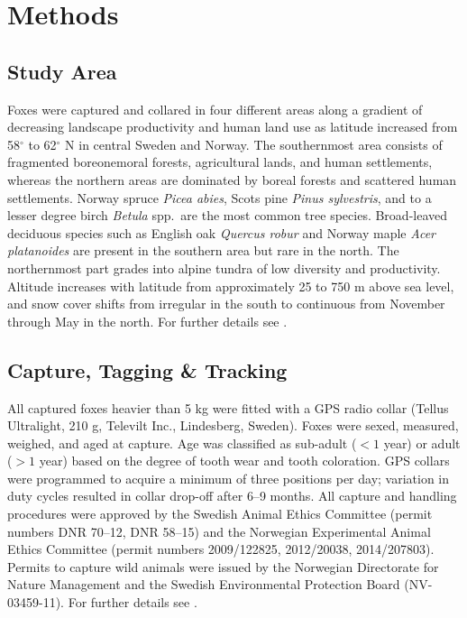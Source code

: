 \documentclass[12pt,a4paper,final,abstract=true,headings=small]{scrartcl}
\begin{document}
\section*{Methods}

\subsection*{Study Area}

Foxes were captured and collared in four different areas along a gradient of decreasing landscape productivity and human land use as latitude increased from 58$^{\circ}$ to 62$^{\circ}$ N in central Sweden and Norway. The southernmost area consists of fragmented boreonemoral forests, agricultural lands, and human settlements, whereas the northern areas are dominated by boreal forests and scattered human settlements. Norway spruce \emph{Picea abies}, Scots pine \emph{Pinus sylvestris}, and to a lesser degree birch \emph{Betula} spp.\ are the most common tree species. Broad-leaved deciduous species such as English oak \emph{Quercus robur} and Norway maple \emph{Acer platanoides} are present in the southern area but rare in the north. The northernmost part grades into alpine tundra of low diversity and productivity. Altitude increases with latitude from approximately 25 to 750 m above sea level, and snow cover shifts from irregular in the south to continuous from November through May in the north. For further details see \citet{waltonVariationHomeRange2017}.

\subsection*{Capture, Tagging \& Tracking}

All captured foxes heavier than 5 kg were fitted with a GPS radio collar (Tellus Ultralight, 210 g, Televilt Inc., Lindesberg, Sweden). Foxes were sexed, measured, weighed, and aged at capture. Age was classified as sub-adult ($< 1$ year) or adult ($> 1$ year) based on the degree of tooth wear and tooth coloration. GPS collars were programmed to acquire a minimum of three positions per day; variation in duty cycles resulted in collar drop-off after 6--9 months. All capture and handling procedures were approved by the Swedish Animal Ethics Committee (permit numbers DNR 70--12, DNR 58--15) and the Norwegian Experimental Animal Ethics Committee (permit numbers 2009/122825, 2012/20038, 2014/207803). Permits to capture wild animals were issued by the Norwegian Directorate for Nature Management and the Swedish Environmental Protection Board (NV-03459-11). For further details see
\citet{waltonVariationHomeRange2017,waltonLongdistanceDispersalRed2018}.
\end{document}
